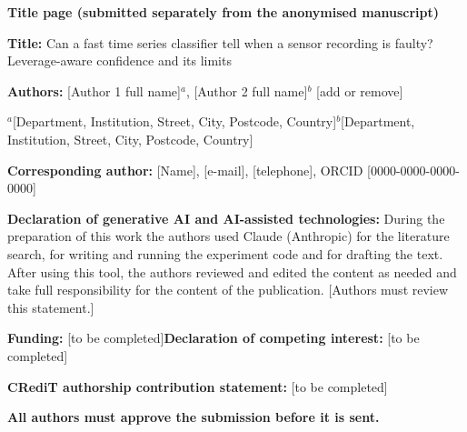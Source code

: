 \documentclass[11pt]{article}
\begin{document}
\textbf{Title page (submitted separately from the anonymised manuscript)}

\textbf{Title:} Can a fast time series classifier tell when a sensor recording is faulty? Leverage-aware confidence and its limits

\textbf{Authors:} [Author 1 full name]$^{a}$, [Author 2 full name]$^{b}$ [add or remove]

$^{a}$[Department, Institution, Street, City, Postcode, Country]\quad $^{b}$[Department, Institution, Street, City, Postcode, Country]

\textbf{Corresponding author:} [Name], [e-mail], [telephone], ORCID [0000-0000-0000-0000]

\textbf{Declaration of generative AI and AI-assisted technologies:} During the preparation of this work the authors used Claude (Anthropic) for the literature search, for writing and running the experiment code and for drafting the text. After using this tool, the authors reviewed and edited the content as needed and take full responsibility for the content of the publication. [Authors must review this statement.]

\textbf{Funding:} [to be completed]\qquad\textbf{Declaration of competing interest:} [to be completed]

\textbf{CRediT authorship contribution statement:} [to be completed]

\textbf{All authors must approve the submission before it is sent.}
\end{document}

